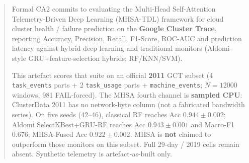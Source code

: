 \begin{abstract}
Formal CA2 commits to evaluating the Multi-Head Self-Attention Telemetry-Driven Deep Learning (MHSA-TDL) framework for cloud cluster health / failure prediction on the \textbf{Google Cluster Trace}, reporting Accuracy, Precision, Recall, F1-Score, ROC-AUC and prediction latency against hybrid deep learning and traditional monitors (Aldomi-style GRU+feature-selection hybrids; RF/KNN/SVM).

This artefact scores that suite on an official \textbf{2011} GCT subset (4 \texttt{task\_events} parts + 2 \texttt{task\_usage} parts + \texttt{machine\_events}; $N{=}12000$ windows, 981 FAIL-forced). The MHSA fourth channel is \textbf{sampled CPU}: ClusterData 2011 has no network-byte column (not a fabricated bandwidth series). On five seeds (42--46), classical RF reaches Acc $0.944\pm0.002$; Aldomi SelectKBest+GRU-RF reaches Acc $0.943\pm0.001$ and Macro-F1 $0.676$; MHSA-Fused Acc $0.922\pm0.002$. MHSA is \textbf{not} claimed to outperform those monitors on this subset. Full 29-day / 2019 cells remain absent. Synthetic telemetry is artefact-as-built only.
\end{abstract}
